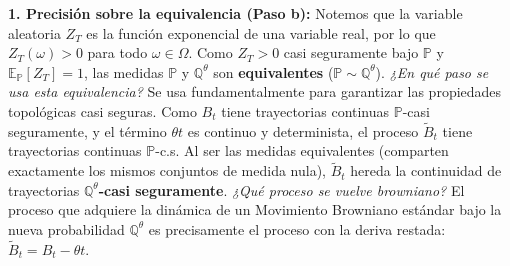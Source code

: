 \documentclass[11pt, letterpaper]{article}
\begin{document}
\begin{solucion}
    \textbf{1. Precisión sobre la equivalencia (Paso b):}
    Notemos que la variable aleatoria $Z_T$ es la función exponencial de una variable real, por lo que $Z_T(\omega) > 0$ para todo $\omega \in \Omega$. Como $Z_T > 0$ casi seguramente bajo $\mathbb{P}$ y $\mathbb{E}_{\mathbb{P}}[Z_T] = 1$, las medidas $\mathbb{P}$ y $\mathbb{Q}^\theta$ son \textbf{equivalentes} ($\mathbb{P} \sim \mathbb{Q}^\theta$). 
    \textit{¿En qué paso se usa esta equivalencia?} Se usa fundamentalmente para garantizar las propiedades topológicas casi seguras. Como $B_t$ tiene trayectorias continuas $\mathbb{P}$-casi seguramente, y el término $\theta t$ es continuo y determinista, el proceso $\tilde{B}_t$ tiene trayectorias continuas $\mathbb{P}$-c.s. Al ser las medidas equivalentes (comparten exactamente los mismos conjuntos de medida nula), $\tilde{B}_t$ hereda la continuidad de trayectorias \textbf{$\mathbb{Q}^\theta$-casi seguramente}.
    \textit{¿Qué proceso se vuelve browniano?} El proceso que adquiere la dinámica de un Movimiento Browniano estándar bajo la nueva probabilidad $\mathbb{Q}^\theta$ es precisamente el proceso con la deriva restada: \textbf{$\tilde{B}_t = B_t - \theta t$}.


\end{solucion}
\end{document}
